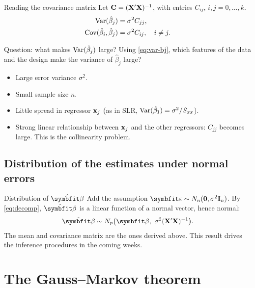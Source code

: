 \begin{frame}{Reading the covariance matrix}
    Let $\mathbf{C} = (\mathbf{X}'\mathbf{X})^{-1}$, with entries $C_{ij}$, $i,j=0,\dots,k$.
    \begin{align}
        \operatorname{Var}(\hat\beta_j) &= \sigma^2 C_{jj}, \label{eq:var-bj}\\
        \operatorname{Cov}(\hat\beta_i,\hat\beta_j) &= \sigma^2 C_{ij}, \quad i\neq j. \notag
    \end{align}
\end{frame}


\begin{frame}{Question: what makes $\operatorname{Var}(\hat\beta_j)$ large?}
    Using \eqref{eq:var-bj}, which features of the data and the design make the variance of $\hat\beta_j$ large?

    \svspace{1em}

    \pause

    \begin{itemize}
        \item Large error variance $\sigma^2$.
        \item Small sample size $n$.
        \item Little spread in regressor $\mathbf{x}_j$ (as in SLR, $\operatorname{Var}(\hat{\beta}_1) = \sigma^2 / S_{xx}$).
        \item Strong linear relationship between $\mathbf{x}_j$ and the other regressors: $C_{jj}$ becomes large. This is the collinearity problem.
    \end{itemize}
\end{frame}


\subsection{Distribution of the estimates under normal errors}


\begin{frame}{Distribution of $\hat{\bbeta}$}
    Add the assumption $\bvarepsilon\sim N_n(\bzero,\sigma^2\bI_n)$. By \eqref{eq:decomp}, $\hat{\bbeta}$ is a linear function of a normal vector, hence normal:
    \begin{align}
        \hat{\bbeta} \sim N_p\big(\bbeta,\ \sigma^2(\bX'\bX)^{-1}\big). \label{eq:beta-dist}
    \end{align}
    The mean and covariance matrix are the ones derived above. This result drives the inference procedures in the coming weeks.
\end{frame}


\section{The Gauss--Markov theorem}


